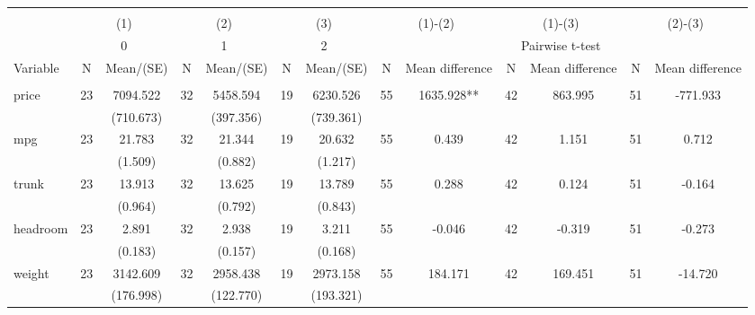 
\begin{tabular}{@{\extracolsep{5pt}}lcccccccccccc}
\\[-1.8ex]\hline \hline \\[-1.8ex]
 & \multicolumn{2}{c}{(1)}  & \multicolumn{2}{c}{(2)}  & \multicolumn{2}{c}{(3)}  & \multicolumn{2}{c}{(1)-(2)} & \multicolumn{2}{c}{(1)-(3)} & \multicolumn{2}{c}{(2)-(3)} \\
 & \multicolumn{2}{c}{0}  & \multicolumn{2}{c}{1}  & \multicolumn{2}{c}{2}  & \multicolumn{6}{c}{Pairwise t-test}  \\
Variable & N & Mean/(SE) & N & Mean/(SE) & N & Mean/(SE) & N & Mean difference & N & Mean difference & N & Mean difference \\ \hline \\[-1.8ex] 
price   & 23    & 7094.522    & 32    & 5458.594    & 19    & 6230.526    & 55    & 1635.928**    & 42    & 863.995    & 51    & -771.933   \\
 &   & (710.673)  &   & (397.356)  &   & (739.361)  &   &  &   &  &   &  \\ [1ex]
mpg   & 23    & 21.783    & 32    & 21.344    & 19    & 20.632    & 55    & 0.439    & 42    & 1.151    & 51    & 0.712   \\
 &   & (1.509)  &   & (0.882)  &   & (1.217)  &   &  &   &  &   &  \\ [1ex]
trunk   & 23    & 13.913    & 32    & 13.625    & 19    & 13.789    & 55    & 0.288    & 42    & 0.124    & 51    & -0.164   \\
 &   & (0.964)  &   & (0.792)  &   & (0.843)  &   &  &   &  &   &  \\ [1ex]
headroom   & 23    & 2.891    & 32    & 2.938    & 19    & 3.211    & 55    & -0.046    & 42    & -0.319    & 51    & -0.273   \\
 &   & (0.183)  &   & (0.157)  &   & (0.168)  &   &  &   &  &   &  \\ [1ex]
weight   & 23    & 3142.609    & 32    & 2958.438    & 19    & 2973.158    & 55    & 184.171    & 42    & 169.451    & 51    & -14.720   \\
 &   & (176.998)  &   & (122.770)  &   & (193.321)  &   &  &   &  &   &  \\ [1ex]

\end{tabular}

